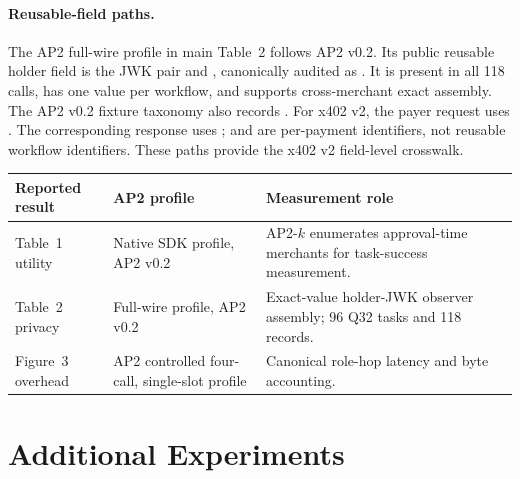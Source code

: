 \documentclass[letterpaper]{article}
\begin{document}
\paragraph{Reusable-field paths.}
\begingroup\sloppy
The AP2 full-wire profile in main Table~2 follows AP2 v0.2. Its public reusable
holder field is the JWK pair
 and
, canonically audited as
. It is present in all 118 calls,
has one value per workflow, and supports cross-merchant exact assembly. The
AP2 v0.2 fixture taxonomy also records
. For x402 v2, the payer request uses
. The corresponding response
uses ;  and
 are per-payment identifiers, not reusable
workflow identifiers. These paths provide the x402 v2 field-level crosswalk.
\endgroup

\begin{MMAppendixTable}[H]
\centering
\begin{tabular}{@{}
  >{\raggedright\arraybackslash}p{}
  >{\raggedright\arraybackslash}p{}
  >{\raggedright\arraybackslash}p{}@{}}
\toprule
\textbf{Reported result} & \textbf{AP2 profile} & \textbf{Measurement role} \\
\midrule
Table~1 utility & Native SDK profile, AP2 v0.2 & AP2-$k$ enumerates approval-time merchants for task-success measurement. \\
Table~2 privacy & Full-wire profile, AP2 v0.2 & Exact-value holder-JWK observer assembly; 96 Q32 tasks and 118 records. \\
Figure~3 overhead & AP2 controlled four-call, single-slot profile & Canonical role-hop latency and byte accounting. \\
\bottomrule
\end{tabular}
\caption{AP2 baseline/profile crosswalk. The table assigns a fixed AP2 v0.2
profile and measurement record to each reported result.}
\label{tab:ap2-profile-crosswalk}
\end{MMAppendixTable}

\section{Additional Experiments}
\label{app:additional-experiments}
\end{document}
